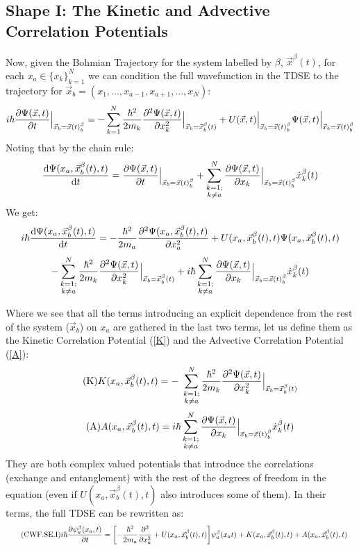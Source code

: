 \documentclass[11pt, a4paper]{article} %
\begin{document}
\subsection{Shape I: The Kinetic and Advective Correlation Potentials}

Now, given the Bohmian Trajectory for the system labelled by $\beta$, $\vec{x}^\beta(t)$, for each $x_a\in\{x_k\}_{k=1}^N$ we can condition the full wavefunction in the TDSE to the trajectory for $\vec{x}_b=(x_1,...,x_{a-1},x_{a+1},...,x_N)$:
$$
i\hbar \pdv{\Psi(\vec{x}, t)}{t}\Big\rvert_{\vec{x}_b=\vec{x}(t)_b^\beta} = - \sum_{k=1}^{N} \frac{\hbar^2}{2m_k}\pdv[2]{\Psi(\vec{x},t)}{x_k}\Big\rvert_{\vec{x}_b=\vec{x}_b^\beta(t)} + U(\vec{x},t)\Big\rvert_{\vec{x}_b=\vec{x}(t)_b^\beta}\Psi(\vec{x},t)\Big\rvert_{\vec{x}_b=\vec{x}(t)_b^\beta}
$$
Noting that by the chain rule:
$$
\dv{\Psi(x_a, \vec{x}_b^\beta(t), t)}{t} = \pdv{\Psi(\vec{x}, t)}{t}\Big\rvert_{\vec{x}_b=\vec{x}(t)_b^\beta} + \sum_{\substack{k=1; \\ k\neq a}}^{N} \pdv{\Psi(\vec{x}, t)}{x_k}\Big\rvert_{\vec{x}_b=\vec{x}(t)_b^\beta} \dot{x}_k^\beta(t)
$$
We get:
$$
i\hbar \dv{\Psi(x_a, \vec{x}_b^\beta(t), t)}{t} = - \frac{\hbar^2}{2m_a}\pdv[2]{\Psi(x_a, \vec{x}_b^\beta(t), t)}{x_a} + U(x_a, \vec{x}_b^\beta(t), t)\Psi(x_a, \vec{x}_b^\beta(t), t) 
$$
$$
- \sum_{\substack{k=1; \\ k\neq a}}^{N} \frac{\hbar^2}{2m_k}\pdv[2]{\Psi(\vec{x},t)}{x_k}\Big\rvert_{\vec{x}_b=\vec{x}_b^\beta(t)} + i \hbar  \sum_{\substack{k=1; \\ k\neq a}}^{N} \pdv{\Psi(\vec{x}, t)}{x_k}\Big\rvert_{\vec{x}_b=\vec{x}(t)_b^\beta} \dot{x}_k^\beta(t)
$$

Where we see that all the terms introducing an explicit dependence from the rest of the system ($\vec{x}_b$) on $x_a$ are gathered in the last two terms, let us define them as the Kinetic Correlation Potential (\ref{K}) and the Advective Correlation Potential (\ref{A}):
\begin{equation}\label{K}\tag{K}
K(x_a, \vec{x}_b^\beta(t), t) = - \ \sum_{\substack{k=1; \\ k\neq a}}^{N} \frac{\hbar^2}{2m_k}\pdv[2]{\Psi(\vec{x},t)}{x_k}\Big\rvert_{\vec{x}_b=\vec{x}_b^\beta(t)}
\end{equation}
\begin{equation}\label{A}\tag{A}
A(x_a, \vec{x}_b^\beta(t), t) =  i \hbar  \sum_{\substack{k=1; \\ k\neq a}}^{N} \pdv{\Psi(\vec{x}, t)}{x_k}\Big\rvert_{\vec{x}_b=\vec{x}(t)_b^\beta} \dot{x}_k^\beta(t)
\end{equation}
They are both complex valued potentials that introduce the correlations (exchange and entanglement) with the rest of the degrees of freedom in the equation (even if $U(x_a, \vec{x}_b^\beta(t), t)$ also introduces some of them). In their terms, the full TDSE can be rewritten as:
\begin{equation*}\label{CWF.SE.I}\tag{CWF.SE.I}
i\hbar \pdv{\psi_a^\beta(x_a, t)}{t} = \qty[- \frac{\hbar^2}{2m_a}\pdv[2]{}{x_a} + U(x_a, \vec{x}_b^\beta(t), t)]\psi_a^\beta(x_a t) + K(x_a, \vec{x}_b^\beta(t), t) +A(x_a, \vec{x}_b^\beta(t), t) \quad
\end{equation*}
\end{document}
